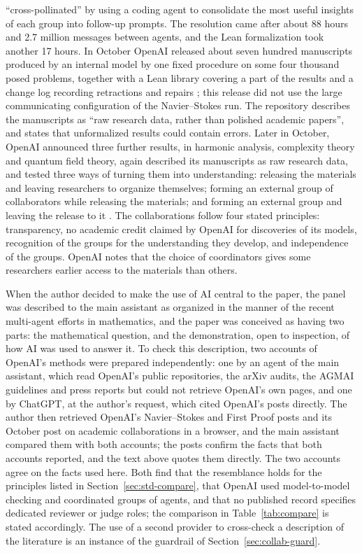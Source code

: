 ``cross-pollinated'' by using a coding agent to consolidate the most useful insights of each group into follow-up
prompts. The resolution came after about 88 hours and 2.7 million messages between agents, and the Lean
formalization took another 17 hours. In October OpenAI released about seven hundred
manuscripts produced by an internal model by one fixed procedure on some four thousand posed problems, together
with a Lean library covering a part of the results and a change log recording retractions and repairs
\citep{openai_math_2026}; this release did not use the large communicating configuration of the Navier--Stokes
run. The repository describes the manuscripts as ``raw research data, rather than polished academic papers'', and
states that unformalized results could contain errors. Later in October, OpenAI announced three further results, in
harmonic analysis, complexity theory and quantum field theory, again described its manuscripts as raw research
data, and tested three ways of turning them into understanding: releasing the materials and leaving researchers to
organize themselves; forming an external group of collaborators while releasing the materials; and forming an
external group and leaving the release to it \citep{openai_academic_2026}. The collaborations follow four stated
principles: transparency, no academic credit claimed by OpenAI for discoveries of its models, recognition of the
groups for the understanding they develop, and independence of the groups. OpenAI notes that the choice of
coordinators gives some researchers earlier access to the materials than others.

\begin{discussion}
When the author decided to make the use of AI central to the paper, the panel was described to the main assistant
as organized in the manner of the recent multi-agent efforts in mathematics, and the paper was conceived as having
two parts: the mathematical question, and the demonstration, open to inspection, of how AI was used to answer it.
To check this description, two accounts of OpenAI's methods were prepared independently: one by an agent of the
main assistant, which read OpenAI's public repositories, the arXiv audits, the AGMAI guidelines and press reports
but could not retrieve OpenAI's own pages, and one by ChatGPT, at the author's request, which cited OpenAI's posts
directly. The author then retrieved OpenAI's Navier--Stokes and First Proof posts and its October post on academic
collaborations in a browser, and the main assistant
compared them with both accounts; the posts confirm the facts that both accounts reported, and the text above
quotes them directly. The two accounts agree on
the facts used here. Both find that the resemblance holds for the principles
listed in Section~\ref{sec:std-compare}, that OpenAI used model-to-model checking and coordinated groups of agents, and that no published
record specifies dedicated reviewer or judge roles; the comparison in Table~\ref{tab:compare} is stated
accordingly. The use of a second provider to cross-check a description of the literature is an instance of the
guardrail of Section~\ref{sec:collab-guard}.
\end{discussion}

